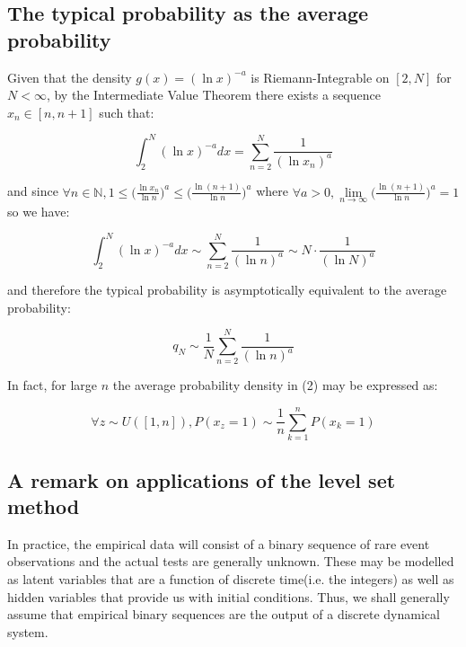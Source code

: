 \documentclass{article}
\begin{document}
\subsection{The typical probability as the average probability}

Given that the density $g(x) = (\ln x)^{-a}$ is Riemann-Integrable on $[2,N]$ for $N < \infty$, by the Intermediate Value Theorem there exists a sequence $x_n \in [n,n+1]$ such that: 

\begin{equation}
\int_{2}^N (\ln x)^{-a} dx = \sum_{n=2}^N \frac{1}{(\ln x_n)^a}
\end{equation}

and since $\forall n \in \mathbb{N}, 1 \leq \big(\frac{\ln x_n}{\ln n}\big)^a \leq \big(\frac{\ln (n+1)}{\ln n}\big)^a$ where $\forall a > 0, \lim\limits_{n \to \infty} \big(\frac{\ln (n+1)}{\ln n}\big)^a = 1$ so we have: 

\begin{equation}
\int_{2}^N (\ln x)^{-a} dx \sim \sum_{n=2}^N \frac{1}{(\ln n)^a} \sim N \cdot \frac{1}{(\ln N)^a}
\end{equation}

and therefore the typical probability is asymptotically equivalent to the 
average probability: 

\begin{equation}
q_N \sim \frac{1}{N} \sum_{n=2}^N \frac{1}{(\ln n)^a} 	
\end{equation}

In fact, for large $n$ the average probability density in (2) may be expressed as: 

\begin{equation}
\forall z \sim U([1,n]), P(x_z = 1) \sim \frac{1}{n} \sum_{k=1}^n P(x_k = 1)	\end{equation}

\subsection{A remark on applications of the level set method}

In practice, the empirical data will consist of a binary sequence of rare event 
observations and the actual tests are generally unknown. These may be modelled 
as latent variables that are a function of discrete time(i.e. the integers) as 
well as hidden variables that provide us with initial conditions. Thus, we shall 
generally assume that empirical binary sequences are the output of a discrete dynamical system.
\end{document}
